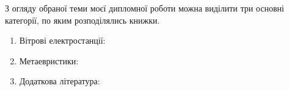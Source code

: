\documentclass[a4paper]{article}
\begin{document}
    \pagestyle{empty}
    \noindent
    З огляду обраної теми моєї дипломної роботи можна виділити три основні категорії, по яким розподілялись книжки.
    \begin{enumerate}
        \item Вітрові електростанції: \cite{Okedu2023, Nielsen2024, MetaheuristicAlgorithmsinEnergy}
        \item Метаевристики: \cite{Wang2024, Okwu2021}
        \item Додаткова література: \cite{ExamplesEnergyModels, ComputationalIntelligence, Lobato2017, Kaul2021, SS2021, Kumar2020}
    \end{enumerate}
    
    \nocite{*}
    \printbibliography
\end{document}
